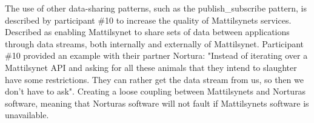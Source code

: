 
The use of other data-sharing patterns, such as the \gls{publish_subscribe} pattern, is described by participant \#10 to increase the quality of Mattilsynets services. Described as enabling Mattilsynet to share sets of data between applications through data streams, both internally and externally of Mattilsynet. Participant \#10 provided an example with their partner Nortura: "Instead of iterating over a Mattilsynet API and asking for all these animals that they intend to slaughter have some restrictions. They can rather get the data stream from us, so then we don't have to ask". Creating a loose coupling between Mattilsynets and Norturas software, meaning that Norturas software will not fault if Mattilsynets software is unavailable.



